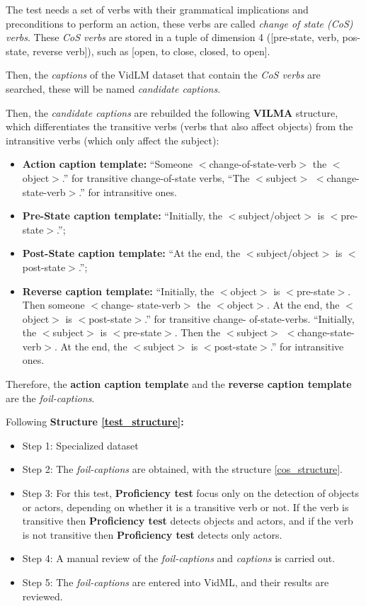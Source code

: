 The test needs a set of verbs with their grammatical implications and preconditions to perform an action, these verbs are called \textit{change of state (CoS) verbs}. These \textit{CoS verbs} are stored in a tuple of dimension 4 ([pre-state, verb, pos-state, reverse verb]), such as [open, to close, closed, to open].

Then, the \textit{captions} of the VidLM dataset that contain the \textit{CoS verbs} are searched, these will be named \textit{candidate captions}.

Then, the \textit{candidate captions} are rebuilded the following \textbf{VILMA} structure, which differentiates the transitive verbs (verbs that also affect objects) from the intransitive verbs (which only affect the subject):

\begin{structure}
\begin{itemize} \label{cos_structure}
\item \textbf{Action caption template:} “Someone $<$change-of-state-verb$>$ the $<$object$>$.” for transitive change-of-state verbs, “The $<$subject$>$ $<$change-state-verb$>$.” for intransitive ones.
\item \textbf{Pre-State caption template:} “Initially, the $<$subject/object$>$ is $<$pre-state$>$.”;
\item \textbf{Post-State caption template:} “At the end, the $<$subject/object$>$ is $<$post-state$>$.”;
\item \textbf{Reverse caption template:} “Initially, the $<$object$>$ is $<$pre-state$>$. Then someone $<$change- state-verb$>$ the $<$object$>$. At the end, the $<$object$>$ is $<$post-state$>$.” for transitive change- of-state-verbs. “Initially, the $<$subject$>$ is $<$pre-state$>$. Then the $<$subject$>$ $<$change-state- verb$>$. At the end, the $<$subject$>$ is $<$post-state$>$.” for intransitive ones.
\end{itemize}
\end{structure}


Therefore, the \textbf{action caption template} and the \textbf{reverse caption template} are the \textit{foil-captions}.

Following \textbf{Structure \ref{test_structure}:}
\begin{itemize}
\item Step 1: Specialized dataset
\item Step 2: The \textit{foil-captions} are obtained, with the structure \ref{cos_structure}.
\item Step 3: For this test, \textbf{Proficiency test} focus only on the detection of objects or actors, depending on whether it is a transitive verb or not. If the verb is transitive then \textbf{Proficiency test} detects objects and actors, and if the verb is not transitive then \textbf{Proficiency test} detects only actors.
\item Step 4: A manual review of the \textit{foil-captions} and \textit{captions} is carried out.
\item Step 5: The \textit{foil-captions} are entered into VidML, and their results are reviewed.
\end{itemize}

